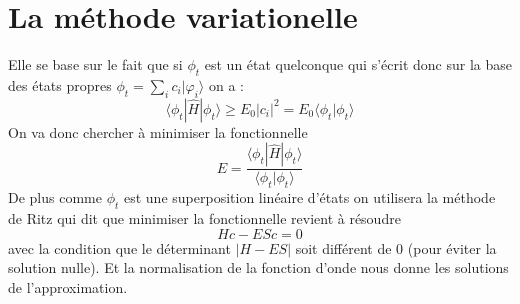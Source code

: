 \section{La méthode variationelle}


Elle se base sur le fait que si $\phi_t$ est un état quelconque qui s'écrit donc sur la base des états propres $\phi_t=\sum_i c_i |\varphi_i \rangle$ on a :
$$
\langle \phi_t|\hat{H}|\phi_t \rangle \geq E_0 |c_i|^2=E_0\langle \phi_t|\phi_t \rangle$$
On va donc chercher à minimiser la fonctionnelle 
$$E=\frac{\langle \phi_t|\hat{H}|\phi_t \rangle}{\langle \phi_t|\phi_t \rangle}$$
De plus comme $\phi_t$ est une superposition linéaire d'états on utilisera la méthode de Ritz qui dit que minimiser la fonctionnelle revient à résoudre
$$Hc-ESc=0$$
avec la condition que le déterminant $|H-ES|$ soit différent de 0 (pour éviter la solution nulle). Et la normalisation de la fonction d'onde nous donne les solutions de l'approximation.